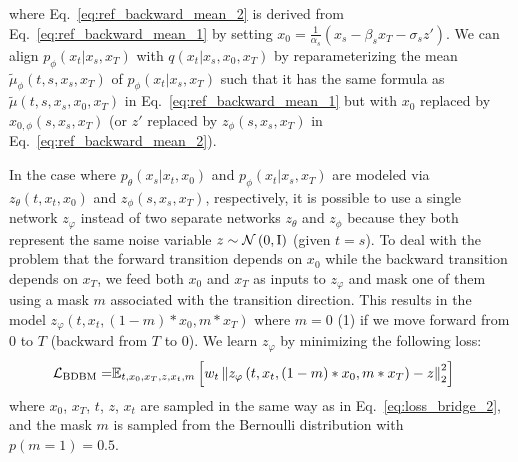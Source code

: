 where Eq.~\ref{eq:ref_backward_mean_2} is derived from Eq.~\ref{eq:ref_backward_mean_1}
by setting $x_{0}=\frac{1}{\alpha_{s}}\left(x_{s}-\beta_{s}x_{T}-\sigma_{s}z'\right)$.
We can align $p_{\phi}\left(x_{t}|x_{s},x_{T}\right)$ with $q\left(x_{t}|x_{s},x_{0},x_{T}\right)$
by reparameterizing the mean $\tilde{\mu}_{\phi}\left(t,s,x_{s},x_{T}\right)$
of $p_{\phi}\left(x_{t}|x_{s},x_{T}\right)$ such that it has the
same formula as $\tilde{\mu}\left(t,s,x_{s},x_{0},x_{T}\right)$ in
Eq.~\ref{eq:ref_backward_mean_1} but with $x_{0}$ replaced by $x_{0,\phi}\left(s,x_{s},x_{T}\right)$
(or $z'$ replaced by $z_{\phi}\left(s,x_{s},x_{T}\right)$ in Eq.~\ref{eq:ref_backward_mean_2}). 

In the case where $p_{\theta}\left(x_{s}|x_{t},x_{0}\right)$ and
$p_{\phi}\left(x_{t}|x_{s},x_{T}\right)$ are modeled via $z_{\theta}\left(t,x_{t},x_{0}\right)$
and $z_{\phi}\left(s,x_{s},x_{T}\right)$, respectively, it is possible
to use a single network $z_{\varphi}$ instead of two separate networks
$z_{\theta}$ and $z_{\phi}$ because they both represent the same
noise variable $z\sim\mathcal{N}\left(0,\mathrm{I}\right)$ (given $t=s$).
To deal with the problem that the forward transition depends on $x_{0}$
while the backward transition depends on $x_{T}$, we feed both $x_{0}$
and $x_{T}$ as inputs to $z_{\varphi}$ and mask one of them using
a mask $m$ associated with the transition direction. This results
in the model $z_{\varphi}\left(t,x_{t},\left(1-m\right)*x_{0},m*x_{T}\right)$
where $m=0$ (1) if we move forward from 0 to $T$ (backward from
$T$ to 0). We learn $z_{\varphi}$ by minimizing the following loss:
\begin{align}
\mathcal{L}_{\text{BDBM}}= & \mathbb{E}_{t,x_{0},x_{T},z,x_{t},m}\left[w_{t}\left\Vert z_{\varphi}\left(t,x_{t},\left(1-m\right)*x_{0},m*x_{T}\right)-z\right\Vert _{2}^{2}\right]\label{eq:loss_BDBM}
\end{align}
where $x_{0}$, $x_{T}$, $t$, $z$, $x_{t}$ are sampled in the
same way as in Eq.~\ref{eq:loss_bridge_2}, and the mask $m$ is
sampled from the Bernoulli distribution with $p\left(m=1\right)=0.5$.

